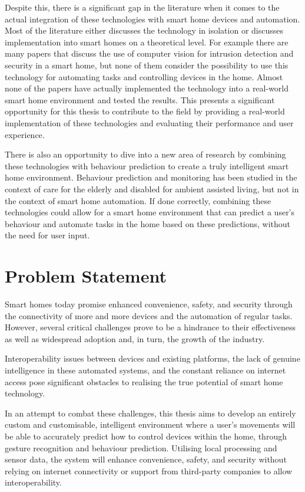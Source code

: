 Despite this, there is a significant gap in the literature when it comes to the actual integration of these technologies with smart home devices and automation.
Most of the literature either discusses the technology in isolation or discusses implementation into smart homes on a theoretical level.
For example there are many papers that discuss the use of computer vision for intrusion detection and security in a smart home, but none of them consider the possibility to use this technology for automating tasks and controlling devices in the home. 
Almost none of the papers have actually implemented the technology into a real-world smart home environment and tested the results.
This presents a significant opportunity for this thesis to contribute to the field by providing a real-world implementation of these technologies and evaluating their performance and user experience.

There is also an opportunity to dive into a new area of research by combining these technologies with behaviour prediction to create a truly intelligent smart home environment.
Behaviour prediction and monitoring has been studied in the context of care for the elderly and disabled for ambient assisted living, but not in the context of smart home automation.
If done correctly, combining these technologies could allow for a smart home environment that can predict a user's behaviour and automate tasks in the home based on these predictions, without the need for user input.

\section{Problem Statement}
Smart homes today promise enhanced convenience, safety, and security through the connectivity of more and more devices and the automation of regular tasks.
However, several critical challenges prove to be a hindrance to their effectiveness as well as widespread adoption and, in turn, the growth of the industry.

Interoperability issues between devices and existing platforms, the lack of genuine intelligence in these automated systems, and the constant reliance on internet access pose significant obstacles to realising the true potential of smart home technology.

In an attempt to combat these challenges, this thesis aims to develop an entirely custom and customisable, intelligent environment where a user's movements will be able to accurately predict how to control devices within the home, through gesture recognition and behaviour prediction.
Utilising local processing and sensor data, the system will enhance convenience, safety, and security without relying on internet connectivity or support from third-party companies to allow interoperability.

